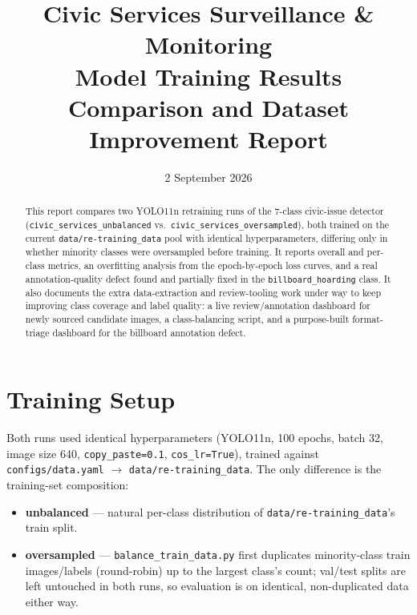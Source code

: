 \documentclass[11pt]{article}
\title{\textbf{Civic Services Surveillance \& Monitoring} \\[4pt]
\large Model Training Results Comparison and Dataset Improvement Report}
\author{}
\date{2 September 2026}
\begin{document}
\maketitle

\begin{abstract}
\noindent This report compares two YOLO11n retraining runs of the 7-class civic-issue
detector (\texttt{civic\_services\_unbalanced} vs.\ \texttt{civic\_services\_oversampled}),
both trained on the current \texttt{data/re-training\_data} pool with identical
hyperparameters, differing only in whether minority classes were oversampled before
training. It reports overall and per-class metrics, an overfitting analysis from the
epoch-by-epoch loss curves, and a real annotation-quality defect found and partially
fixed in the \texttt{billboard\_hoarding} class. It also documents the extra
data-extraction and review-tooling work under way to keep improving class coverage and
label quality: a live review/annotation dashboard for newly sourced candidate images, a
class-balancing script, and a purpose-built format-triage dashboard for the billboard
annotation defect.
\end{abstract}

\tableofcontents

\section{Training Setup}
Both runs used identical hyperparameters (YOLO11n, 100 epochs, batch 32, image size 640,
\texttt{copy\_paste=0.1}, \texttt{cos\_lr=True}), trained against
\texttt{configs/data.yaml} $\to$ \texttt{data/re-training\_data}. The only difference is
the training-set composition:

\begin{itemize}
  \item \textbf{unbalanced} — natural per-class distribution of \texttt{data/re-training\_data}'s
    train split.
  \item \textbf{oversampled} — \texttt{balance\_train\_data.py} first duplicates
    minority-class train images/labels (round-robin) up to the largest class's count;
    val/test splits are left untouched in both runs, so evaluation is on identical,
    non-duplicated data either way.
\end{itemize}

\end{document}
